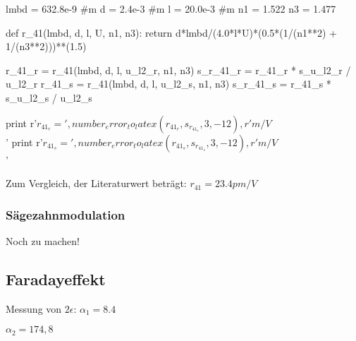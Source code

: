 \begin{python}
lmbd = 632.8e-9 #m
d = 2.4e-3 #m
l = 20.0e-3 #m
n1 = 1.522
n3 = 1.477

def r_41(lmbd, d, l, U, n1, n3):
  return d*lmbd/(4.0*l*U)*(0.5*(1/(n1**2) + 1/(n3**2)))**(1.5)

r_41_r = r_41(lmbd, d, l, u_l2_r, n1, n3)
s_r_41_r = r_41_r * s_u_l2_r / u_l2_r
r_41_s = r_41(lmbd, d, l, u_l2_s, n1, n3)
s_r_41_s = r_41_s * s_u_l2_s / u_l2_s

print r'$r_{41_r} = ', number_error_to_latex(r_41_r, s_r_41_r, 3, -12), r' m/V$\\'
print r'$r_{41_s} = ', number_error_to_latex(r_41_s, s_r_41_s, 3, -12), r' m/V$\\'


\end{python}

Zum Vergleich, der Literaturwert beträgt: $r_{41} = 23.4 pm/V$

\subsubsection{Sägezahnmodulation}

Noch zu machen!


\subsection{Faradayeffekt}

Messung von $2\epsilon$:
$\alpha_1 = 8.4$

$\alpha_2 = 174,8$

\newcommand{\faradayDesc}{
Wir berechnen das Magnetfeld auf der Achse:

und integrieren darüber
$\int H dl$

Vergleich mit $ H = \frac{N I}{l} $

Berechnen die Verdetkonstante

$$ \alpha = l V H $$

Wir führen eine lineare Regression durch und erhalten die Steigung $a$ und den Achsenabschnitt $b$.

Es gilt $$ \alpha = V \int H(z) dz= V 2556 I = a I + b $$

Der Achsenabschnitt $b$ enthält den Offset bei der Winkelmessung und ist nicht weiter von Bedeutung.

Somit erhalten wir die Verdetkonstante aus $$ V = \frac{a}{2556} $$  

}

